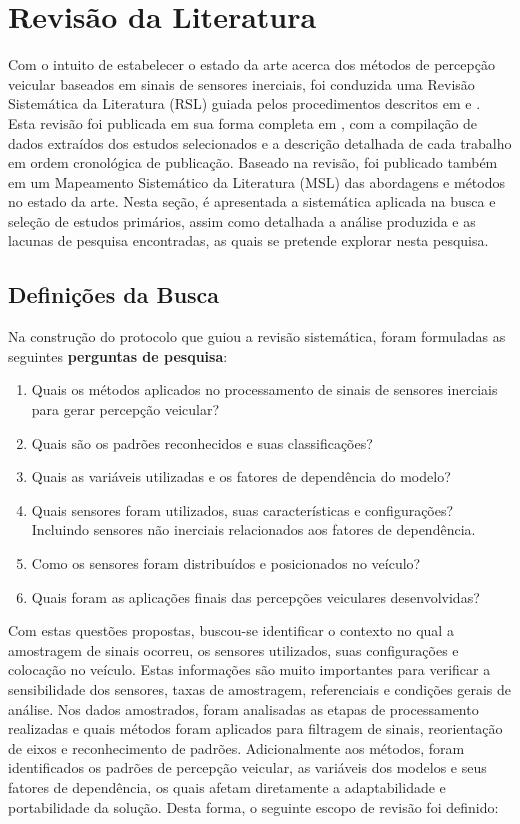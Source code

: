 \chapter{Revisão da Literatura}
\label{cap:revisao}

Com o intuito de estabelecer o estado da arte acerca dos métodos de percepção veicular baseados em sinais de sensores inerciais, foi conduzida uma Revisão Sistemática da Literatura (RSL) guiada pelos procedimentos descritos em  e . Esta revisão foi publicada em sua forma completa em , com a compilação de dados extraídos dos estudos selecionados e a descrição detalhada de cada trabalho em ordem cronológica de publicação. Baseado na revisão, foi publicado também em  um Mapeamento Sistemático da Literatura (MSL) das abordagens e métodos no estado da arte. Nesta seção, é apresentada a sistemática aplicada na busca e seleção de estudos primários, assim como detalhada a análise produzida e as lacunas de pesquisa encontradas, as quais se pretende explorar nesta pesquisa. 

\section{Definições da Busca}

Na construção do protocolo que guiou a revisão sistemática, foram formuladas as seguintes \textbf{perguntas de pesquisa}:

\begin{enumerate}
\item Quais os métodos aplicados no processamento de sinais de sensores inerciais para gerar percepção veicular?
\item Quais são os padrões reconhecidos e suas classificações?
\item Quais as variáveis utilizadas e os fatores de dependência do modelo?
\item Quais sensores foram utilizados, suas características e configurações? Incluindo sensores não inerciais relacionados aos fatores de dependência.
\item Como os sensores foram distribuídos e posicionados no veículo?
\item Quais foram as aplicações finais das percepções veiculares desenvolvidas?
\end{enumerate}

Com estas questões propostas, buscou-se identificar o contexto no qual a amostragem de sinais ocorreu, os sensores utilizados, suas configurações e colocação no veículo. Estas informações são muito importantes para verificar a sensibilidade dos sensores, taxas de amostragem, referenciais e condições gerais de análise. Nos dados amostrados, foram analisadas as etapas de processamento realizadas e quais métodos foram aplicados para filtragem de sinais, reorientação de eixos e reconhecimento de padrões. Adicionalmente aos métodos, foram identificados os padrões de percepção veicular, as variáveis dos modelos e seus fatores de dependência, os quais afetam diretamente a adaptabilidade e portabilidade da solução. Desta forma, o seguinte escopo de revisão foi definido:

